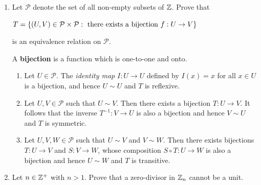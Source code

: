 \documentclass[11pt,fleqn,dvipsnames,usenames]{article}
\begin{document}
\begin{enumerate}
\item Let $\mathcal{P}$ denote the set of all non-empty subsets of $\mathbb{Z}$.  Prove that
\begin{center}
$T = \left\{(U,V)\in \mathcal{P}\times\mathcal{P}:\text{ there exists a bijection }f:U\to V\right\}$
\end{center}
is an equivalence relation on $\mathcal{P}$.
\vsmsp

\recall A \textbf{bijection} is a function which is one-to-one and onto.
\vsmsp

\solution
\begin{enumerate}[(1)]
\item Let $U\in \mathcal{P}$.  The \textit{identity map} $I:U\to U$ defined by $I(x) = x$ for all $x\in U$ is a bijection, and hence $U\sim U$ and $T$ is reflexive.
\item Let $U,V\in\mathcal{P}$ such that $U\sim V$.  Then there exists a bijection $T:U\to V$.  It follows that the inverse $T^{-1}:V\to U$ is also a bijection and hence $V\sim U$ and $T$ is symmetric.
\item Let $U,V, W\in\mathcal{P}$ such that $U\sim V$ and $V\sim W$.  Then there exists bijections $T:U\to V$ and $S:V\to W$, whose composition $S\circ T:U\to W$ is also a bijection and hence $U\sim W$ and $T$ is transitive.
\end{enumerate}
\item Let $n\in\mathbb{Z}^+$ with $n > 1$.  Prove that a zero-divisor in $\mathbb{Z}_n$ cannot be a unit.


\end{enumerate}
\end{document}
